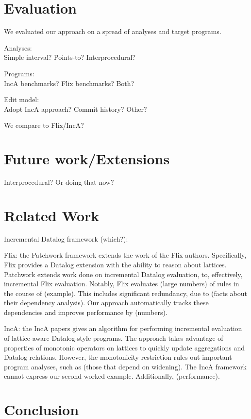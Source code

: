 \documentclass[acmlarge,anonymous]{acmart}\settopmatter{printfolios=true}
\begin{document}
\section{Evaluation}

We evaluated our approach on a spread of analyses and target programs.

Analyses:\\
Simple interval? Points-to? Interprocedural?

Programs:\\
IncA benchmarks? Flix benchmarks? Both?

Edit model:\\
Adopt IncA approach? Commit history? Other?

We compare to {Flix/IncA}?

\section{Future work/Extensions}

Interprocedural? Or doing that now?

\section{Related Work}

Incremental Datalog framework (which?):

Flix: the Patchwork framework extends the work of the Flix authors. Specifically, Flix provides a Datalog extension with the ability to reason about lattices. Patchwork extends work done on incremental Datalog evaluation, to, effectively, incremental Flix evaluation. Notably, Flix evaluates (large numbers) of rules in the course of (example). This includes significant redundancy, due to (facts about their dependency analysis). Our approach automatically tracks these dependencies and improves performance by (numbers).

IncA: the IncA papers gives an algorithm for performing incremental evaluation of lattice-aware Datalog-style programs. The approach takes advantage of properties of monotonic operators on lattices to quickly update aggregations and Datalog relations. However, the monotonicity restriction rules out important program analyses, such as (those that depend on widening). The IncA framework cannot express our second worked example. Additionally, (performance).

\section{Conclusion}
\end{document}
